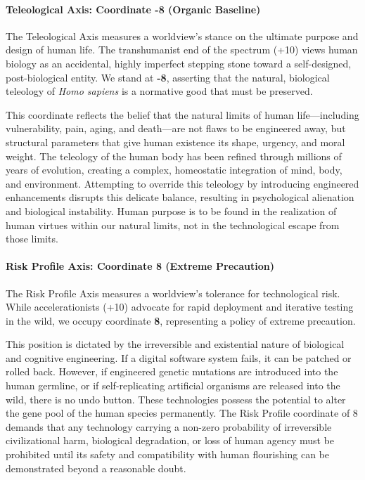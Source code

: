 \paragraph{Teleological Axis: Coordinate -8 (Organic
Baseline)}\label{teleological-axis-coordinate--8-organic-baseline}

The Teleological Axis measures a worldview's stance on the ultimate
purpose and design of human life. The transhumanist end of the spectrum
(+10) views human biology as an accidental, highly imperfect stepping
stone toward a self-designed, post-biological entity. We stand at
\textbf{-8}, asserting that the natural, biological teleology of
\emph{Homo sapiens} is a normative good that must be preserved.

This coordinate reflects the belief that the natural limits of human
life---including vulnerability, pain, aging, and death---are not flaws
to be engineered away, but structural parameters that give human
existence its shape, urgency, and moral weight. The teleology of the
human body has been refined through millions of years of evolution,
creating a complex, homeostatic integration of mind, body, and
environment. Attempting to override this teleology by introducing
engineered enhancements disrupts this delicate balance, resulting in
psychological alienation and biological instability. Human purpose is to
be found in the realization of human virtues within our natural limits,
not in the technological escape from those limits.

\paragraph{Risk Profile Axis: Coordinate 8 (Extreme
Precaution)}\label{risk-profile-axis-coordinate-8-extreme-precaution}

The Risk Profile Axis measures a worldview's tolerance for technological
risk. While accelerationists (+10) advocate for rapid deployment and
iterative testing in the wild, we occupy coordinate \textbf{8},
representing a policy of extreme precaution.

This position is dictated by the irreversible and existential nature of
biological and cognitive engineering. If a digital software system
fails, it can be patched or rolled back. However, if engineered genetic
mutations are introduced into the human germline, or if self-replicating
artificial organisms are released into the wild, there is no undo
button. These technologies possess the potential to alter the gene pool
of the human species permanently. The Risk Profile coordinate of 8
demands that any technology carrying a non-zero probability of
irreversible civilizational harm, biological degradation, or loss of
human agency must be prohibited until its safety and compatibility with
human flourishing can be demonstrated beyond a reasonable doubt.

